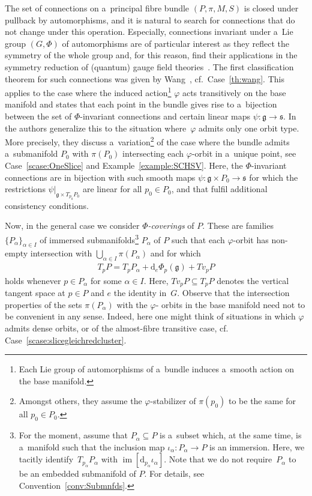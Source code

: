 \documentclass[pdftex]{sigma}
\numberwithin{equation}{section}
\begin{document}
The set of connections on a~principal f\/ibre bundle $(P,\pi,M,S)$ is closed under pullback by automorphisms, and it is
natural to search for connections that do not change under this operation.
Especially, connections invariant under a~Lie group $(G,\Phi)$ of automorphisms are of particular interest as they
ref\/lect the symmetry of the whole group and, for this reason, f\/ind their applications in the symmetry reduction of
(quantum) gauge f\/ield theories~\cite{MathStrucLQG, ChrisSymmLQG, InvConnLQG}. The f\/irst classif\/ication theorem for such
connections was given by Wang~\cite{Wang}, cf.~Case~\ref{th:wang}.
This applies to the case where the induced action\footnote{Each Lie group of automorphisms of a~bundle induces a~smooth
action on the base manifold.} $\varphi$ acts transitively on the base manifold and states that each point in the bundle
gives rise to a~bijection between the set of $\Phi$-invariant connections and certain linear maps $\psi\colon
\mathfrak{g}\rightarrow \mathfrak{s}$.
In~\cite{HarSni} the authors generalize this to the situation where~$\varphi$ admits only one orbit type.
More precisely, they discuss a~variation\footnote{Amongst others, they assume the $\varphi$-stabilizer of $\pi(p_0)$ to
be the same for all $p_0\in P_0$.} of the case where the bundle admits a~submanifold $P_0$ with $\pi(P_0)$ intersecting
each $\varphi$-orbit in a~unique point, see Case~\ref{scase:OneSlice} and Example~\ref{example:SCHSV}.
Here, the $\Phi$-invariant connections are in bijection with such smooth maps $\psi\colon \mathfrak{g}\times
P_0\rightarrow \mathfrak{s}$ for which the restrictions $\psi|_{\mathfrak{g}\times T_{p_0}P_0}$ are linear for all
$p_0\in P_0$, and that fulf\/il additional consistency conditions.

Now, in the general case we consider \emph{$\Phi$-coverings} of $P$.
These are families $\{P_\alpha\}_{\alpha\in I}$ of immer\-sed submanifolds\footnote{For the moment, assume that
$P_\alpha\subseteq P$ is a~subset which, at the same time, is a~manifold such that the inclusion map $\iota_\alpha
\colon P_\alpha \rightarrow P$ is an immersion.
Here, we tacitly identify~$T_{p_\alpha}P_\alpha$ with $\operatorname{\mathrm{im}}[\mathrm{d}_{p_\alpha}\iota_\alpha]$.
Note that we do not require~$P_\alpha$ to be an embedded submanifold of $P$.
For details, see Convention~\ref{conv:Submnfds}.} $P_\alpha$ of $P$ such that each $\varphi$-orbit has non-empty
intersection with $\bigcup_{\alpha\in I}\pi(P_\alpha)$ and for which
\begin{gather*}
T_{p}P = T_{p}P_\alpha +
\mathrm{d}_e\Phi_p(\mathfrak{g}) + Tv_{p}P
\end{gather*}
holds whenever $p\in P_\alpha$ for some $\alpha\in I$.
Here, $Tv_{p}P\subseteq T_pP$ denotes the vertical tangent space at $p\in P$ and $e$ the identity in~$G$.
Observe that the intersection properties of the sets $\pi(P_\alpha)$ with the $\varphi$- orbits in the base manifold
need not to be convenient in any sense.
Indeed, here one might think of situations in which $\varphi$ admits dense orbits, or of the almost-f\/ibre transitive case, cf.
Case~\ref{scase:slicegleichredcluster}.
\end{document}
